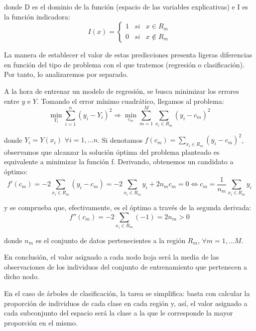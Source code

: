 \documentclass[12pt,twoside]{article}
\begin{document}
\noindent
donde D es el dominio de la función (espacio de las variables explicativas) e I es la función indicadora:
\begin{equation*}
I(x) = 
\left\{
\begin{array}{ccc}
1 & si & x \in R_m \\
0 & si & x \not\in R_m 
\end{array}
\right.
\end{equation*}

La manera de establecer el valor de estas predicciones presenta ligeras diferencias en función del tipo de problema con el que tratemos (regresión o clasificación). Por tanto, lo analizaremos por separado.


A la hora de entrenar un modelo de regresión, se busca minimizar los errores entre $y$ e $Y$. Tomando el error mínimo cuadrático, llegamos al problema:
\begin{equation*}
\min_{Y_i} \sum_{i=1}^n (y_i - Y_i)^2 \Rightarrow \min_{c_m} \sum_{m = 1}^M \sum_{x_i \in R_m} (y_i - c_m)^2
\end{equation*}

\noindent
donde $Y_i = Y(x_i) \, \, \forall i=1,...n$. Si denotamos $f(c_m) = \sum_{x_i \in R_m} (y_i - c_m)^2$, observamos que alcanzar la solución óptima del problema planteado es equivalente a minimizar la función f. Derivando, obtenemos un candidato a óptimo:
\begin{equation*}
f'(c_m) = -2 \sum_{x_i \in R_m} (y_i - c_m) = -2 \sum_{x_i \in R_m}y_i + 2n_mc_m = 0 \Leftrightarrow c_m = \frac{1}{n_m} \sum_{x_i \in R_m}y_i
\end{equation*}

\noindent
y se comprueba que, efectivamente, es el óptimo a través de la segunda derivada:
\begin{equation*}
f''(c_m) = -2 \sum_{x_i \in R_m} (-1) = 2n_m > 0
\end{equation*}

\noindent
donde $n_m$ es el conjunto de datos pertenecientes a la región $R_m$, $\forall m = 1,...M$.

En conclusión, el valor asignado a cada nodo hoja será la media de las observaciones de los individuos del conjunto de entrenamiento que pertenecen a dicho nodo.

En el caso de árboles de clasificación, la tarea se simplifica: basta con calcular la proporción de individuos de cada clase en cada región y, así, el valor asignado a cada subconjunto del espacio será la clase a la que le corresponde la mayor proporción en el mismo.
\end{document}
